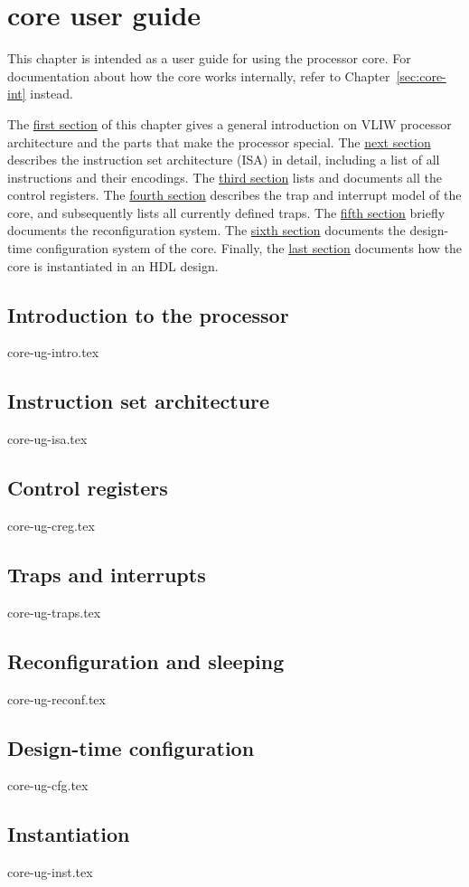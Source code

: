 \chapter{\rvex{} core user guide}
\label{sec:core-ug}

This chapter is intended as a user guide for using the \rvex{} processor core.
For documentation about how the core works internally, refer to
Chapter~\ref{sec:core-int} instead.

The \hyperref[sec:core-ug-intro]{first section} of this chapter gives a general 
introduction on VLIW processor architecture and the parts that make the \rvex{} 
processor special. The \hyperref[sec:core-ug-isa]{next section} describes the 
instruction set architecture (ISA) in detail, including a list of all 
instructions and their encodings. The \hyperref[sec:core-ug-creg]{third section} 
lists and documents all the control registers. The 
\hyperref[sec:core-ug-traps]{fourth section} describes the trap and interrupt 
model of the core, and subsequently lists all currently defined traps. The 
\hyperref[sec:core-ug-reconf]{fifth section} briefly documents the 
reconfiguration system. The \hyperref[sec:core-ug-cfg]{sixth section} documents 
the design-time configuration system of the core. Finally, the 
\hyperref[sec:core-ug-inst]{last section} documents how the core is instantiated 
in an HDL design.

\clearpage
\section{Introduction to the \rvex{} processor}
{core-ug-intro.tex}

\clearpage
\section{Instruction set architecture}
{core-ug-isa.tex}

\clearpage
\section{Control registers}
{core-ug-creg.tex}

\clearpage
\section{Traps and interrupts}
{core-ug-traps.tex}

\clearpage
\section{Reconfiguration and sleeping}
{core-ug-reconf.tex}

\clearpage
\section{Design-time configuration}
{core-ug-cfg.tex}

\clearpage
\section{Instantiation}
{core-ug-inst.tex}

